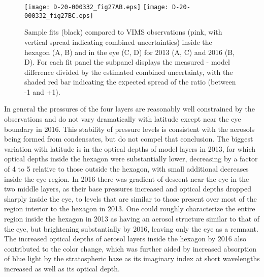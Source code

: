 \documentclass[article,11pt]{emulateapj}
\begin{document}
\begin{figure*}[!t]\centering
\hspace{-0.15in}\texttt{[image: D-20-000332\_fig27AB.eps]}\hspace{-0.05in}
\texttt{[image: D-20-000332\_fig27BC.eps]}
\caption{Sample fits (black) compared to VIMS observations (pink, with vertical
spread indicating combined uncertainties) inside the hexagon (A, B)
and in the eye (C, D) for 2013 (A, C) and 2016 (B, D).  For each fit panel
the subpanel displays the measured - model difference divided by the
estimated combined uncertainty, with the shaded red bar indicating the
expected spread of the ratio (between -1 and +1).}
\label{Fig:specfits}
\end{figure*}

In general the pressures of the four layers are reasonably
well constrained by the observations and do not vary dramatically with
latitude except near the eye boundary in 2016.  This stability of
pressure levels is consistent with the aerosols being formed from
condensates, but do not compel that conclusion.  The biggest variation
with latitude is in the optical depths of model layers in 2013, for
which optical depths inside the hexagon were substantially lower,
decreasing by a factor of 4 to 5 relative to those outside the hexagon,
with small additional decreases inside the eye region.  In 2016 there
was gradient of descent near the eye in the two middle layers, as
their base pressures increased and optical depths dropped sharply inside
the eye, to levels that are similar to those present over most of the
region interior to the hexagon in 2013. One could roughly characterize the
entire region inside the hexagon in 2013 as having an aerosol structure
similar to that of the eye, but brightening substantially by 2016,
leaving only the eye as a remnant.  The increased optical depths of
aerosol layers inside the hexagon by 2016 also contributed to the color
change, which was further aided by increased absorption of blue light
by the stratospheric haze as its imaginary index at short wavelengths
increased as well as its optical depth.
\end{document}
